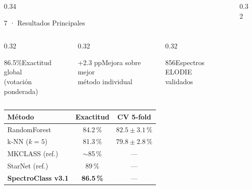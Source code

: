\documentclass[final]{beamer}
\begin{document}
\begin{frame}[t]{}
\begin{columns}[t,totalwidth=\paperwidth]
\begin{column}{0.34\paperwidth}
\begin{block}{7 · Resultados Principales}
    \vspace{0.3cm}
    \begin{columns}[c]
      \begin{column}{0.32\linewidth}
        \begin{tcolorbox}[stat,title={}]
          86.5\%\tcblower Exactitud global\\(votación ponderada)
        \end{tcolorbox}
      \end{column}
      \begin{column}{0.32\linewidth}
        \begin{tcolorbox}[stat,title={}]
          +2.3 pp\tcblower Mejora sobre mejor\\método individual
        \end{tcolorbox}
      \end{column}
      \begin{column}{0.32\linewidth}
        \begin{tcolorbox}[stat,title={}]
          856\tcblower Espectros ELODIE\\validados
        \end{tcolorbox}
      \end{column}
    \end{columns}

    \vspace{0.5cm}

    \begin{center}
    \renewcommand{\arraystretch}{1.3}
    \begin{tabular}{lcc}
      \toprule
      \textbf{Método} & \textbf{Exactitud} & \textbf{CV 5-fold} \\
      \midrule
      RandomForest    & 84.2\,\%  & $82.5\pm3.1$\,\% \\
      k-NN ($k=5$)    & 81.3\,\%  & $79.8\pm2.8$\,\% \\
      MKCLASS (ref.)  & $\sim$85\,\% & — \\
      StarNet (ref.)  & 89\,\%    & — \\
      \midrule
      \textbf{SpectroClass v3.1} & \textbf{86.5\,\%} & — \\
      \bottomrule
    \end{tabular}
    \end{center}
  \end{block}

\end{column}

\begin{column}{0.32\paperwidth}


\end{column}
\end{columns}
\end{frame}
\end{document}
